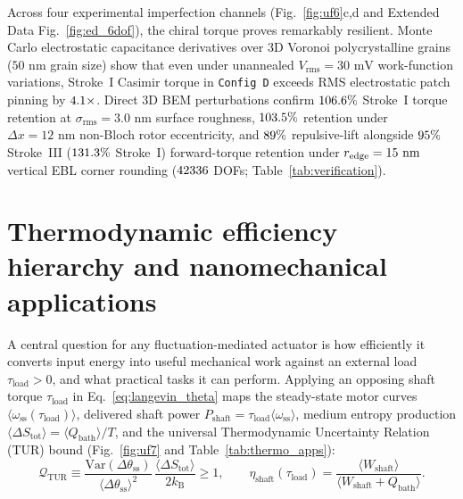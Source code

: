 \documentclass[11pt,a4paper]{article}
\begin{document}
Across four experimental imperfection channels (Fig.~\ref{fig:uf6}c,d and Extended Data Fig.~\ref{fig:ed_6dof}), the chiral torque proves remarkably resilient. Monte Carlo electrostatic capacitance derivatives over 3D Voronoi polycrystalline grains ($50\text{ nm}$ grain size) show that even under unannealed $V_{\mathrm{rms}} = 30\text{ mV}$ work-function variations\cite{garrett2015patch}, Stroke~I Casimir torque in \texttt{Config D} exceeds RMS electrostatic patch pinning by $4.1{}\times$. Direct 3D BEM perturbations confirm $106.6{}\%$ Stroke~I torque retention at $\sigma_{\mathrm{rms}} = 3.0\text{ nm}$ surface roughness, $103.5{}\%$ retention under $\Delta x = 12\text{ nm}$ non-Bloch rotor eccentricity, and $89{}\%$ repulsive-lift alongside $95{}\%$ Stroke~III ($131.3{}\%$ Stroke~I) forward-torque retention under $r_{\mathrm{edge}} = 15{}\text{ nm}$ vertical EBL corner rounding ($42336{}$ DOFs; Table~\ref{tab:verification}).

\section*{Thermodynamic efficiency hierarchy and nanomechanical applications}

A central question for any fluctuation-mediated actuator is how efficiently it converts input energy into useful mechanical work against an external load $\tau_{\mathrm{load}} > 0$, and what practical tasks it can perform. Applying an opposing shaft torque $\tau_{\mathrm{load}}$ in Eq.~\eqref{eq:langevin_theta} maps the steady-state motor curves $\langle\omega_{\mathrm{ss}}(\tau_{\mathrm{load}})\rangle$, delivered shaft power $P_{\mathrm{shaft}} = \tau_{\mathrm{load}}\langle\omega_{\mathrm{ss}}\rangle$, medium entropy production $\langle\Delta S_{\mathrm{tot}}\rangle = \langle Q_{\mathrm{bath}}\rangle/T$, and the universal Thermodynamic Uncertainty Relation (TUR) bound\cite{barato2015tur,gingrich2016tur} (Fig.~\ref{fig:uf7} and Table~\ref{tab:thermo_apps}):
\begin{equation}
\mathcal{Q}_{\mathrm{TUR}} \equiv \frac{\mathrm{Var}(\Delta\theta_{\mathrm{ss}})}{\langle\Delta\theta_{\mathrm{ss}}\rangle^2}\,\frac{\langle\Delta S_{\mathrm{tot}}\rangle}{2 k_{\mathrm{B}}} \ge 1, \qquad \eta_{\mathrm{shaft}}(\tau_{\mathrm{load}}) = \frac{\langle W_{\mathrm{shaft}}\rangle}{\langle W_{\mathrm{shaft}} + Q_{\mathrm{bath}}\rangle}.
\label{eq:tur_emp}
\end{equation}
\end{document}
